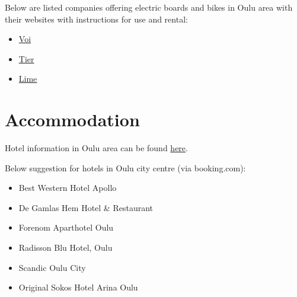 \documentclass[
  oneside]{book}
\providecommand{\tightlist}{%
  \setlength{\itemsep}{0pt}\setlength{\parskip}{0pt}}
\begin{document}
Below are listed companies offering electric boards and bikes in Oulu area with their websites with instructions for use and rental:

\begin{itemize}
\tightlist
\item
  \href{https://www.voiscooters.com/}{Voi}
\item
  \href{https://www.tier.app/en/}{Tier}
\item
  \href{https://www.li.me/}{Lime}
\end{itemize}

\hypertarget{accommodation}{%
\section{Accommodation}\label{accommodation}}

Hotel information in Oulu area can be found
\href{https://visitoulu.fi/en/arrival-overnight/}{here}.

Below suggestion for hotels in Oulu city centre (via booking.com):

\begin{itemize}
\tightlist
\item
  Best Western Hotel Apollo
\item
  De Gamlas Hem Hotel \& Restaurant
\item
  Forenom Aparthotel Oulu
\item
  Radisson Blu Hotel, Oulu
\item
  Scandic Oulu City
\item
  Original Sokos Hotel Arina Oulu
\end{itemize}

  
\end{document}
